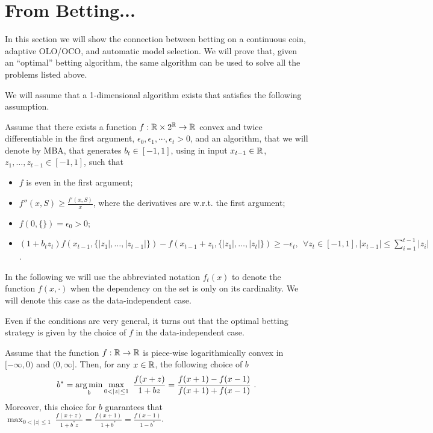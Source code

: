 \section{From Betting...}

In this section we will show the connection between betting on a continuous coin, adaptive \ac{OLO}/\ac{OCO}, and automatic model selection. We will prove that, given an ``optimal'' betting algorithm, the same algorithm can be used to solve all the problems listed above.

We will assume that a 1-dimensional algorithm exists that satisfies the following assumption.
\begin{assumption}
\label{assumption:1-d_algo}
Assume that there exists a function $f:\mathbb{R} \times 2^{\mathbb{R}} \rightarrow \mathbb{R}$ convex and twice differentiable in the first argument, $\epsilon_0, \epsilon_1,\cdots, \epsilon_t>0$, and an algorithm, that we will denote by \ac{MBA}, that generates $b_t \in [-1 , 1]$, using in input $x_{t-1} \in \mathbb{R}$, $z_1, \ldots, z_{t-1} \in [-1,1]$, such that
\begin{itemize}
\item $f$ is even in the first argument;
\item $f''(x, S) \geq \frac{f'(x,S)}{x}$, where the derivatives are w.r.t. the first argument;
\item $f(0,\{\})=\epsilon_0>0$;
\item  $
(1+b_t z_t) f\left( x_{t-1}, \{|z_1|, \ldots, |z_{t-1}|\} \right) - f\left( x_{t-1}+z_t, \{|z_1|, \ldots, |z_t|\}\right) \geq -\epsilon_t, \ \ \forall z_{t} \in [-1,1], |x_{t-1}| \leq \sum_{i=1}^{t-1} |z_i|
$.
\end{itemize}
\end{assumption}
In the following we will use the abbreviated notation $f_t(x)$ to denote the function $f(x,\cdot)$ when the dependency on the set is only on its cardinality. We will denote this case as the data-independent case.

Even if the conditions are very general, it turns out that the optimal betting strategy is given by the choice of $f$ in the data-independent case.
\begin{theorem}
\label{theo:opt_beta}
Assume that the function $f:\mathbb{R} \rightarrow \mathbb{R}$ is piece-wise logarithmically convex in $[-\infty,0)$ and $(0,\infty]$. Then, for any $x\in \mathbb{R}$,  the following choice of $b$
\[
b^* = \argmin_{b} \max_{0<|z|\leq 1} \ \frac{f(x+z)}{1+b z} =\frac{f(x+1) - f(x-1)}{f(x+1) + f(x-1)}~.
\]
Moreover, this choice for $b$ guarantees that $\max_{0<|z|\leq 1} \ \frac{f(x+z)}{1+b^* z} = \frac{f(x+1)}{1+b^*}=\frac{f(x-1)}{1-b^*}$.
\end{theorem}

